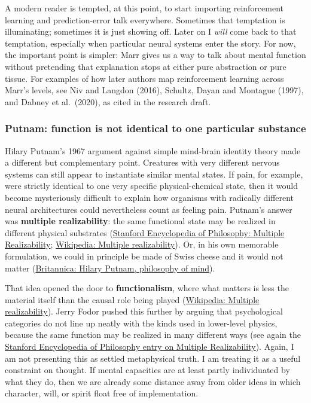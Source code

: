 A modern reader is tempted, at this point, to start importing reinforcement learning and prediction-error talk everywhere. Sometimes that temptation is illuminating; sometimes it is just showing off. Later on I \emph{will} come back to that temptation, especially when particular neural systems enter the story. For now, the important point is simpler: Marr gives us a way to talk about mental function without pretending that explanation stops at either pure abstraction or pure tissue. For examples of how later authors map reinforcement learning across Marr's levels, see Niv and Langdon (2016), Schultz, Dayan and Montague (1997), and Dabney et al.~(2020), as cited in the research draft.

\subsubsection{Putnam: function is not identical to one particular substance}\label{03_it_started-putnam-function-is-not-identical-to-one-particular-substance}

Hilary Putnam's 1967 argument against simple mind-brain identity theory made a different but complementary point. Creatures with very different nervous systems can still appear to instantiate similar mental states. If pain, for example, were strictly identical to one very specific physical-chemical state, then it would become mysteriously difficult to explain how organisms with radically different neural architectures could nevertheless count as feeling pain. Putnam's answer was \textbf{multiple realizability}: the same functional state may be realized in different physical substrates (\href{https://plato.stanford.edu/entries/multiple-realizability/}{Stanford Encyclopedia of Philosophy: Multiple Realizability}; \href{https://en.wikipedia.org/wiki/Multiple_realizability}{Wikipedia: Multiple realizability}). Or, in his own memorable formulation, we could in principle be made of Swiss cheese and it would not matter (\href{https://www.britannica.com/biography/Hilary-Putnam/Philosophy-of-mind}{Britannica: Hilary Putnam, philosophy of mind}).

That idea opened the door to \textbf{functionalism}, where what matters is less the material itself than the causal role being played (\href{https://en.wikipedia.org/wiki/Multiple_realizability}{Wikipedia: Multiple realizability}). Jerry Fodor pushed this further by arguing that psychological categories do not line up neatly with the kinds used in lower-level physics, because the same function may be realized in many different ways (see again the \href{https://plato.stanford.edu/entries/multiple-realizability/}{Stanford Encyclopedia of Philosophy entry on Multiple Realizability}). Again, I am not presenting this as settled metaphysical truth. I am treating it as a useful constraint on thought. If mental capacities are at least partly individuated by what they do, then we are already some distance away from older ideas in which character, will, or spirit float free of implementation.

